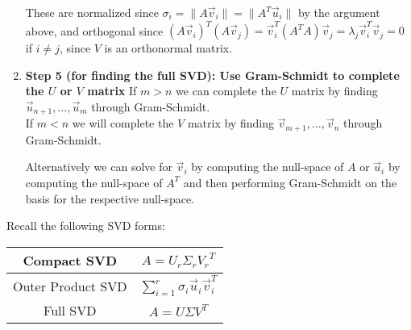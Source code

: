 \begin{enumerate}[label=(\roman*)]
  These are normalized since $\sigma_i = \|A \vec{v}_i\| = \|A^{T} \vec{u}_i \|$ by the argument above, and orthogonal since $(A\vec{v}_i)^T(A\vec{v}_j) = \vec{v}_i^T(A^T A)\vec{v}_j = \lambda_j \vec{v}_i^T\vec{v}_j = 0$ if $i \neq j$, since $V$ is an orthonormal matrix.

  \item \textbf{Step 5 (for finding the full SVD): Use Gram-Schmidt to complete the $U$ or $V$ matrix} \vskip 1pt
  If $m > n$ we can complete the $U$ matrix by finding $\vec{u}_{n + 1}, \ldots, \vec{u}_{m}$ through Gram-Schmidt. \\
  If $m < n$ we will complete the $V$ matrix by finding $\vec{v}_{m + 1}, \ldots, \vec{v}_{n}$ through Gram-Schmidt.

  Alternatively we can solve for $\vec{v}_{i}$ by computing the null-space of $A$ or $\vec{u}_{i}$ by computing the null-space of $A^{T}$ and then performing Gram-Schmidt on the basis for the respective null-space.

\end{enumerate}

Recall the following SVD forms:

\begin{center} \begin{tabular}{|c|c|}
  \hline
  Compact SVD       & $A = U_r \Sigma_r {V_r}^T$ \\ \hline
  Outer Product SVD & $\sum_{i=1}^{r} \sigma_{i} \vec{u}_{i} \vec{v}_{i}^T$ \\ \hline
  Full SVD          & $A = U \Sigma V^T$ \\ \hline
\end{tabular} \end{center}

